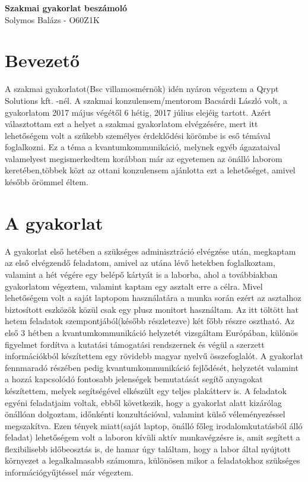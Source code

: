 \clearpage
\begin{center}
\large
\textbf{Szakmai gyakorlat beszámoló}\\
Solymos Balázs - O60Z1K
\end{center}

\section*{Bevezető}

A szakmai gyakorlatot(Bsc villamosmérnök) idén nyáron végeztem a Qrypt Solutions kft. -nél. A szakmai konzulensem/mentorom Bacsárdi László volt, a gyakorlatom 2017 május végétől 6 hétig, 2017 július elejéig tartott. Azért választottam ezt a helyet a szakmai gyakorlatom elvégzésére, mert itt lehetőségem volt a szűkebb személyes érdeklődési körömbe is eső témával foglalkozni. Ez a téma a kvantumkommunikáció, melynek egyéb ágazataival valamelyest megismerkedtem korábban már az egyetemen az önálló laborom keretében,többek közt az ottani konzulensem ajánlotta ezt a lehetőséget, amivel később örömmel éltem. 

\section*{A gyakorlat}

A gyakorlat első hetében a szükséges adminisztráció elvégzése után, megkaptam az első elvégzendő feladatom, amivel az utána lévő hetekben foglalkoztam, valamint a hét végére egy belépő kártyát is a laborba, ahol a továbbiakban gyakorlatom végeztem, valamint kaptam egy asztalt erre a célra. Mivel lehetőségem volt a saját laptopom használatára a munka során ezért az asztalhoz biztosított eszközök közül csak egy plusz monitort használtam. Az itt töltött hat hetem feladatok szempontjából(később részletezve) két főbb részre osztható. Az első 3 hétben a kvantumkommunikáció helyzetét vizsgáltam Európában, különös figyelmet fordítva a kutatási támogatási rendszernek és végül a szerzett információkból készítettem egy rövidebb magyar nyelvű összefoglalót. A gyakorlat fennmaradó részében pedig kvantumkommunikáció fejlődését, helyzetét valamint a hozzá kapcsolódó fontosabb jelenségek bemutatását segítő anyagokat készítettem, melyek segítségével elkészült egy teljes plakátterv is. A feladatok egyéni feladatjaim voltak, ebből következik, hogy a gyakorlat alatt kizárólag önállóan dolgoztam, időnkénti konzultációval, valamint külső véleményezéssel megszakítva. Ezen tények miatt(saját laptop, önálló főleg irodalomkutatásból álló feladat) lehetőségem volt a laboron kívüli aktív munkavégzésre is, amit segített a flexibilisebb időbeosztás is, de hamar úgy találtam, hogy a labor által nyújtott környezet a legalkalmasabb számomra, különösen mikor a feladatokhoz szükséges információgyűjtéssel már végeztem.

